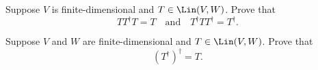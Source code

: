 \begin{exercise}
Suppose $V$ is finite-dimensional and $T\in\Lin(V,W)$. Prove that
\[ TT^\dagger T = T \quad\text{and}\quad T^\dagger TT^\dagger = T^\dagger. \]
\end{exercise}

\begin{exercise}
Suppose $V$ and $W$ are finite-dimensional and $T\in\Lin(V,W)$. Prove that
\[ (T^\dagger)^\dagger = T. \]
\end{exercise}
